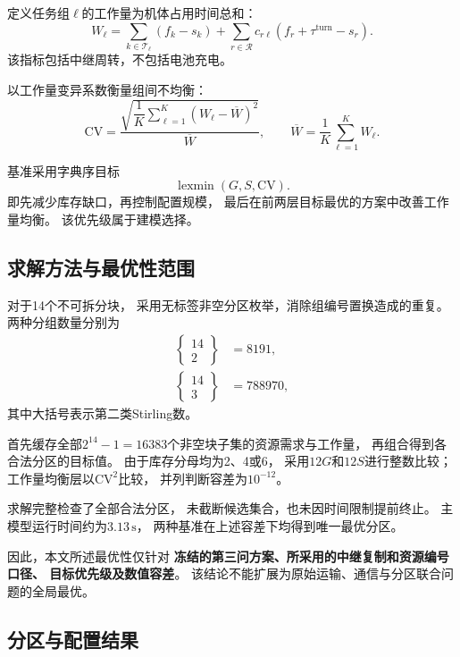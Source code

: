 \documentclass[bwprint]{gmcmthesis}
\begin{document}
定义任务组$\ell$的工作量为机体占用时间总和：
\begin{equation}
W_\ell
=
\sum_{k\in\mathcal{T}_\ell}(f_k-s_k)
+
\sum_{r\in\mathcal{R}}
c_{r\ell}(f_r+\tau^{\mathrm{turn}}-s_r).
\end{equation}
该指标包括中继周转，不包括电池充电。

以工作量变异系数衡量组间不均衡：
\begin{equation}
\mathrm{CV}
=
\frac{
\sqrt{\dfrac{1}{K}\sum_{\ell=1}^{K}(W_\ell-\overline{W})^2}
}{\overline{W}},
\qquad
\overline{W}=\frac{1}{K}\sum_{\ell=1}^{K}W_\ell.
\end{equation}

基准采用字典序目标
\begin{equation}
\operatorname{lexmin}(G,S,\mathrm{CV}).
\end{equation}
即先减少库存缺口，再控制配置规模，
最后在前两层目标最优的方案中改善工作量均衡。
该优先级属于建模选择。

\subsection{求解方法与最优性范围}

对于14个不可拆分块，
采用无标签非空分区枚举，消除组编号置换造成的重复。
两种分组数量分别为
\begin{align}
\left\{\begin{matrix}14\\2\end{matrix}\right\}
&=8191,\\
\left\{\begin{matrix}14\\3\end{matrix}\right\}
&=788970,
\end{align}
其中大括号表示第二类Stirling数。

首先缓存全部$2^{14}-1=16383$个非空块子集的资源需求与工作量，
再组合得到各合法分区的目标值。
由于库存分母均为2、4或6，
采用$12G$和$12S$进行整数比较；
工作量均衡层以$\mathrm{CV}^2$比较，
并列判断容差为$10^{-12}$。

求解完整检查了全部合法分区，
未截断候选集合，也未因时间限制提前终止。
主模型运行时间约为$3.13\,\mathrm{s}$，
两种基准在上述容差下均得到唯一最优分区。

因此，本文所述最优性仅针对
\textbf{冻结的第三问方案、所采用的中继复制和资源编号口径、
目标优先级及数值容差}。
该结论不能扩展为原始运输、通信与分区联合问题的全局最优。

\subsection{分区与配置结果}
\end{document}
